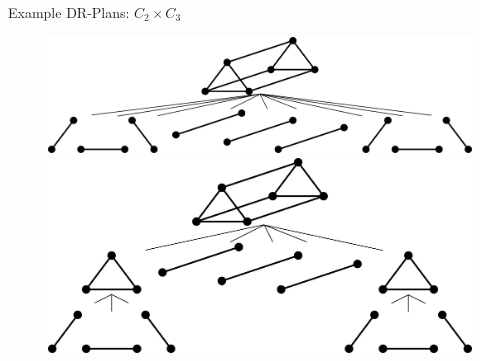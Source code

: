\documentclass{mySlides}
\newcommand{\n}{\vspace{1em}}
\begin{document}
\begin{frame}{Example DR-Plans: $C_2\times C_3$}
    \begin{figure}
        \includegraphics[width=0.9\linewidth]{../../img/svg/drplanning_illustration_a}

        \pause
        \n

        \includegraphics[width=0.9\linewidth]{../../img/svg/drplanning_illustration_b}
    \end{figure}
\end{frame}
\end{document}
